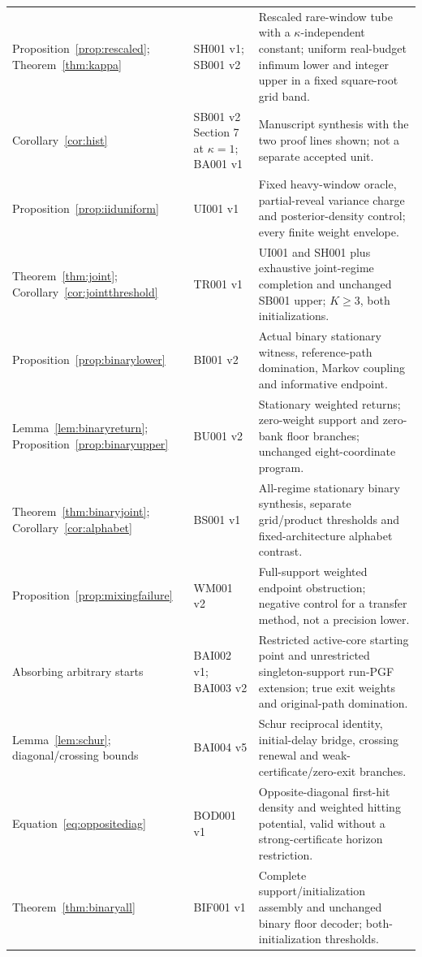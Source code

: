 \documentclass[11pt,letterpaper]{article}
\theoremstyle{definition}\newtheorem{definition}[theorem]{Definition}
\theoremstyle{remark}\newtheorem{remark}[theorem]{Remark}
\newcommand{\unit}[1]{\textsf{#1}}
\begin{document}
\begin{center}
\begin{longtable}{@{}>{\raggedright\arraybackslash}p{}>{\raggedright\arraybackslash}p{}>{\raggedright\arraybackslash}p{}@{}}
Proposition~\ref{prop:rescaled}; Theorem~\ref{thm:kappa} & \unit{SH001 v1}; \unit{SB001 v2} & Rescaled rare-window tube with a $\kappa$-independent constant; uniform real-budget infimum lower and integer upper in a fixed square-root grid band.\\[4pt]
Corollary~\ref{cor:hist} & \unit{SB001 v2} Section 7 at $\kappa=1$; \unit{BA001 v1} & Manuscript synthesis with the two proof lines shown; not a separate accepted unit.\\[4pt]
Proposition~\ref{prop:iiduniform} & \unit{UI001 v1} & Fixed heavy-window oracle, partial-reveal variance charge and posterior-density control; every finite weight envelope.\\[4pt]
Theorem~\ref{thm:joint}; Corollary~\ref{cor:jointthreshold} & \unit{TR001 v1} & UI001 and SH001 plus exhaustive joint-regime completion and unchanged SB001 upper; $K\ge3$, both initializations.\\[4pt]
Proposition~\ref{prop:binarylower} & \unit{BI001 v2} & Actual binary stationary witness, reference-path domination, Markov coupling and informative endpoint.\\[4pt]
Lemma~\ref{lem:binaryreturn}; Proposition~\ref{prop:binaryupper} & \unit{BU001 v2} & Stationary weighted returns; zero-weight support and zero-bank floor branches; unchanged eight-coordinate program.\\[4pt]
Theorem~\ref{thm:binaryjoint}; Corollary~\ref{cor:alphabet} & \unit{BS001 v1} & All-regime stationary binary synthesis, separate grid/product thresholds and fixed-architecture alphabet contrast.\\[4pt]
Proposition~\ref{prop:mixingfailure} & \unit{WM001 v2} & Full-support weighted endpoint obstruction; negative control for a transfer method, not a precision lower.\\[4pt]
Absorbing arbitrary starts & \unit{BAI002 v1}; \unit{BAI003 v2} & Restricted active-core starting point and unrestricted singleton-support run-PGF extension; true exit weights and original-path domination.\\[4pt]
Lemma~\ref{lem:schur}; diagonal/crossing bounds & \unit{BAI004 v5} & Schur reciprocal identity, initial-delay bridge, crossing renewal and weak-certificate/zero-exit branches.\\[4pt]
Equation~\eqref{eq:oppositediag} & \unit{BOD001 v1} & Opposite-diagonal first-hit density and weighted hitting potential, valid without a strong-certificate horizon restriction.\\[4pt]
Theorem~\ref{thm:binaryall} & \unit{BIF001 v1} & Complete support/initialization assembly and unchanged binary floor decoder; both-initialization thresholds.\\[4pt]

\end{longtable}
\end{center}
\end{document}
